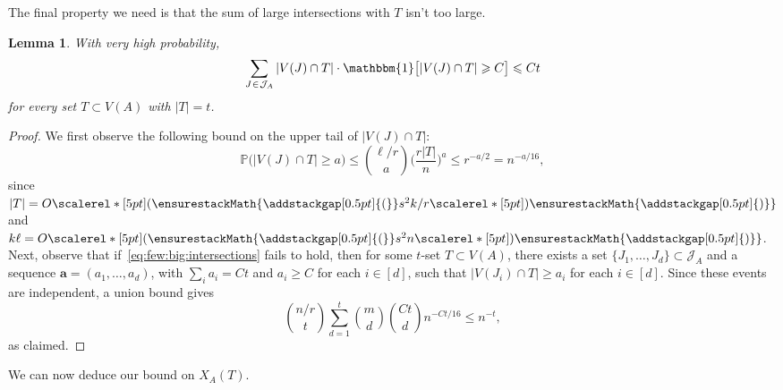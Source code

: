 \documentclass[12pt,reqno]{amsart}
\newcommand\pig[1]{\scalerel*[5pt]{\normalsize#1}{%
  \ensurestackMath{\addstackgap[0.5pt]{\normalsize#1}}}}
\newtheorem{lemma}[theorem]{Lemma}
\theoremstyle{remark}
\numberwithin{theorem}{section}
\renewcommand{\(}{\bigl(}
\renewcommand{\)}{\bigr)\vphantom{)}}
\newcommand{\ina}{\hspace{0.02cm}\in\hspace{0.02cm}}
\newcommand{\cJ}{\mathcal J}
\def\1{\mathbbm{1}}
\renewcommand{\le}{\leqslant}
\renewcommand{\ge}{\geqslant}
\renewcommand{\Pr}{\mathbb{P}}
\def\va{\mathbf{a}}
\begin{document}
The final property we need is that the sum of large intersections with $T$ isn't too large.

\begin{lemma}\label{lem:few:big:intersections}
With very high probability, 
\begin{equation}\label{eq:few:big:intersections}
\sum_{J \ina \cJ_A} |V(J) \cap T| \cdot \1\big[ |V(J) \cap T| \ge C \big] \le Ct
\end{equation}
for every set $T \subset V(A)$ with $|T| = t$.
\end{lemma}

\begin{proof}
We first observe the following bound on the upper tail of $|V(J) \cap T|$:
$$\Pr\big( |V(J) \cap T| \ge a \big) \le {\ell/r \choose a} \bigg( \frac{r |T|}{n} \bigg)^a \le r^{-a/2} = n^{-a/16},$$
since $|T| = O\pig( s^2 k / r \pig)$ and $k\ell = O\pig( s^2 n \pig)$. Next, observe that if~\eqref{eq:few:big:intersections} fails to hold, then for some $t$-set $T \subset V(A)$, there exists a set $\{ J_1, \ldots, J_d \} \subset \cJ_A$ and a sequence $\va = (a_1,\ldots,a_d)$, with $\sum_i a_i = Ct$ and $a_i \ge C$ for each $i \in [d]$, such that $|V(J_i) \cap T| \ge a_i$ for each $i \in [d]$. Since these events are independent, a union bound gives 
$${n/r \choose t} \sum_{d = 1}^t {m \choose d} {Ct \choose d} n^{-Ct/16} \le n^{-t},$$
as claimed.
\end{proof}

We can now deduce our bound on $X_A(T)$. 
\end{document}
